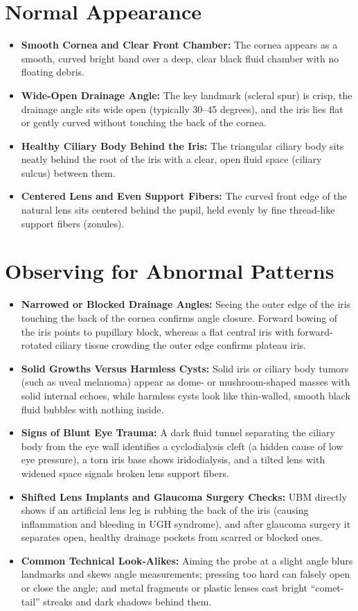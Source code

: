\section{Normal Appearance}

\begin{itemize}
    \item \textbf{Smooth Cornea and Clear Front Chamber:} The cornea appears as a smooth, curved bright band over a deep, clear black fluid chamber with no floating debris.
    \item \textbf{Wide-Open Drainage Angle:} The key landmark (scleral spur) is crisp, the drainage angle sits wide open (typically 30--45 degrees), and the iris lies flat or gently curved without touching the back of the cornea.
    \item \textbf{Healthy Ciliary Body Behind the Iris:} The triangular ciliary body sits neatly behind the root of the iris with a clear, open fluid space (ciliary sulcus) between them.
    \item \textbf{Centered Lens and Even Support Fibers:} The curved front edge of the natural lens sits centered behind the pupil, held evenly by fine thread-like support fibers (zonules).
\end{itemize}

\section{Observing for Abnormal Patterns}

\begin{itemize}
    \item \textbf{Narrowed or Blocked Drainage Angles:} Seeing the outer edge of the iris touching the back of the cornea confirms angle closure. Forward bowing of the iris points to pupillary block, whereas a flat central iris with forward-rotated ciliary tissue crowding the outer edge confirms plateau iris.
    \item \textbf{Solid Growths Versus Harmless Cysts:} Solid iris or ciliary body tumors (such as uveal melanoma) appear as dome- or mushroom-shaped masses with solid internal echoes, while harmless cysts look like thin-walled, smooth black fluid bubbles with nothing inside.
    \item \textbf{Signs of Blunt Eye Trauma:} A dark fluid tunnel separating the ciliary body from the eye wall identifies a cyclodialysis cleft (a hidden cause of low eye pressure), a torn iris base shows iridodialysis, and a tilted lens with widened space signals broken lens support fibers.
    \item \textbf{Shifted Lens Implants and Glaucoma Surgery Checks:} UBM directly shows if an artificial lens leg is rubbing the back of the iris (causing inflammation and bleeding in UGH syndrome), and after glaucoma surgery it separates open, healthy drainage pockets from scarred or blocked ones.
    \item \textbf{Common Technical Look-Alikes:} Aiming the probe at a slight angle blurs landmarks and skews angle measurements; pressing too hard can falsely open or close the angle; and metal fragments or plastic lenses cast bright ``comet-tail'' streaks and dark shadows behind them.
\end{itemize}

